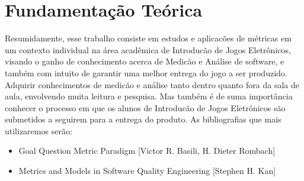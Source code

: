 \chapter{Fundamentação Teórica}

Resumidamente, esse trabalho consiste em estudos e aplicacões de métricas em um contexto individual na área acadêmica de Introducão de Jogos Eletrônicos, visando o ganho de conhecimento acerca de Medicão e Análise de software, e também com intuito de garantir uma melhor entrega do jogo a ser produzido.
Adquirir conhecimentos de medicão e análise tanto dentro quanto fora da sala de aula, envolvendo muita leitura e pesquisa. Mas também é de suma importância conhecer o processo em que os alunos de Introducão de Jogos Eletrônicos são submetidos a seguirem para a entrega do produto.
As bibliografias que mais utilizaremos serão:
\begin{itemize}
\item Goal Question Metric Paradigm [Victor R. Basili, H. Dieter Rombach]
\item Metrics and Models in Software Quality Engineering [Stephen H. Kan]
\end{itemize}